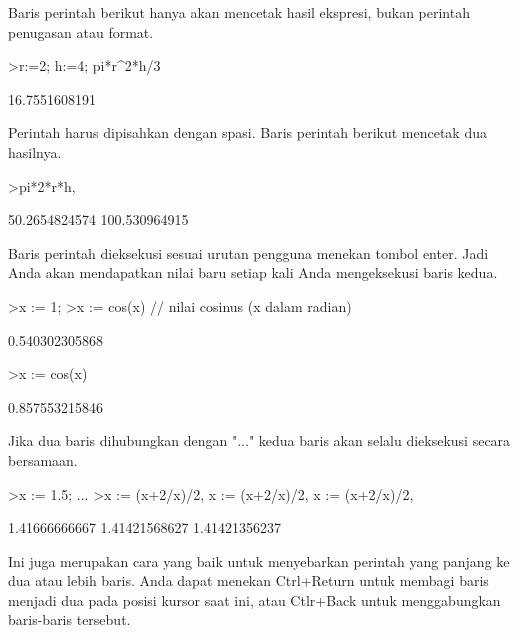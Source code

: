 \documentclass[a4paper,10pt]{article}
\begin{document}
\begin{eulernotebook}
\begin{eulercomment}
\begin{eulercomment}
\begin{eulercomment}
Baris perintah berikut hanya akan mencetak hasil ekspresi, bukan
perintah penugasan atau format.
\end{eulercomment}
\begin{eulerprompt}
>r:=2; h:=4; pi*r^2*h/3
\end{eulerprompt}
\begin{euleroutput}
  16.7551608191
\end{euleroutput}
\begin{eulercomment}
Perintah harus dipisahkan dengan spasi. Baris perintah berikut
mencetak dua hasilnya.
\end{eulercomment}
\begin{eulerprompt}
>pi*2*r*h, %
\end{eulerprompt}
\begin{euleroutput}
  50.2654824574
  100.530964915
\end{euleroutput}
\begin{eulercomment}
Baris perintah dieksekusi sesuai urutan pengguna menekan tombol enter.
Jadi Anda akan mendapatkan nilai baru setiap kali Anda mengeksekusi
baris kedua.
\end{eulercomment}
\begin{eulerprompt}
>x := 1;
>x := cos(x) // nilai cosinus (x dalam radian)
\end{eulerprompt}
\begin{euleroutput}
  0.540302305868
\end{euleroutput}
\begin{eulerprompt}
>x := cos(x)
\end{eulerprompt}
\begin{euleroutput}
  0.857553215846
\end{euleroutput}
\begin{eulercomment}
Jika dua baris dihubungkan dengan "..." kedua baris akan selalu
dieksekusi secara bersamaan.
\end{eulercomment}
\begin{eulerprompt}
>x := 1.5; ...
>x := (x+2/x)/2, x := (x+2/x)/2, x := (x+2/x)/2, 
\end{eulerprompt}
\begin{euleroutput}
  1.41666666667
  1.41421568627
  1.41421356237
\end{euleroutput}
\begin{eulercomment}
Ini juga merupakan cara yang baik untuk menyebarkan perintah yang
panjang ke dua atau lebih baris. Anda dapat menekan Ctrl+Return untuk
membagi baris menjadi dua pada posisi kursor saat ini, atau Ctlr+Back
untuk menggabungkan baris-baris tersebut.


\end{eulercomment}
\end{eulercomment}
\end{eulercomment}
\end{eulernotebook}
\end{document}
